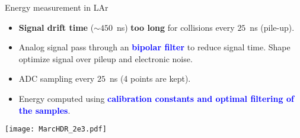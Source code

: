 \begin{frame}{Energy measurement in LAr}
  \begin{minipage}{0.3\linewidth}
\end{minipage}
\hfill
\begin{minipage}{0.69\linewidth}
\begin{itemize}
\item {\bf Signal drift time }($\sim 450$~ns) {\bf too long} for collisions every $25$~ns (pile-up).
\item Analog signal pass through an \textcolor{blue}{\bf bipolar filter } to reduce signal time.
Shape optimize signal over pileup and electronic noise.
\item ADC sampling every $25$~ns (4 points are kept).
\item Energy computed using \textcolor{blue}{\bf calibration constants and optimal filtering of the samples}.
\end{itemize}
\end{minipage}
\begin{center}
    \texttt{[image: MarcHDR\_2e3.pdf]}
\end{center}

\end{frame}

